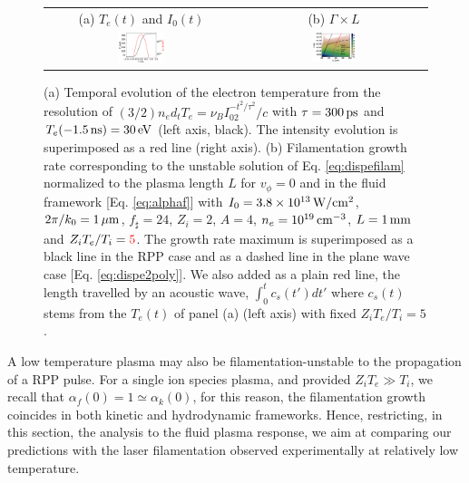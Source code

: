 \documentclass[
 reprint,
 superscriptaddress,
 amsmath,amssymb,
 aps,
]{revtex4-1}
\def\tc{\textcolor{red}}
\begin{document}
\begin{figure}
\begin{tabular}{cc}
(a) $T_e(t)$ and $I_0(t)$&
(b) $\Gamma \times L$  \\
\includegraphics[width=0.245\textwidth]{xp_fuchs_te_new.eps}& 
\includegraphics[width=0.24\textwidth]{xp_fuchs_new.eps}
\end{tabular}
\caption{ \label{fig:xpfuchs_th}  
(a) Temporal evolution of the electron temperature 
from the resolution of $(3/2)n_e d_tT_e=\nu_BI_02^{-t^2/\tau^2}/c$ with $\tau = 300\,\rm ps$  and $T_e(-1.5 \, \rm{ns})=30\,\rm eV$ (left axis, black).
The intensity evolution is superimposed as a red line (right axis).
(b) Filamentation growth rate corresponding to the unstable solution  of Eq. \eqref{eq:dispefilam} normalized to the plasma length  $L$  for $v_\phi=0$ and in the fluid framework [Eq. \eqref{eq:alphaf}] with $I_0=3.8\times 10^{13}\, \rm W/cm^2$, $2\pi/k_0=1\,\rm\mu m$, $f_\sharp=24$, $Z_i=2$, $A=4$, $n_e=10^{19} \,\rm cm^{-3}$,  $L=1\,\rm mm$ and  $Z_iT_e/T_i=\tc{5}$. 
The growth rate maximum is superimposed as a  black line in the RPP case and as a dashed line in the plane wave case [Eq. \eqref{eq:dispe2poly}]. We also added as a plain red line, the length travelled by an acoustic wave, $\int_0^t c_s(t')dt'$ where $c_s(t)$ stems from the $T_e(t)$ of panel (a) (left axis) with fixed $Z_iT_e/T_i=5$.
 }
\end{figure}

A low temperature plasma may also be filamentation-unstable to the  propagation of a RPP pulse.
For a single ion species plasma, and provided $Z_iT_e\gg T_i$,   we recall that $\alpha_f(0)=1\simeq \alpha_k(0)$, for this reason, the filamentation growth coincides in both  kinetic and hydrodynamic frameworks. 
Hence, restricting, in this section, the analysis to the fluid plasma response, we aim at comparing our predictions with the laser filamentation observed experimentally at relatively low temperature.
\end{document}
